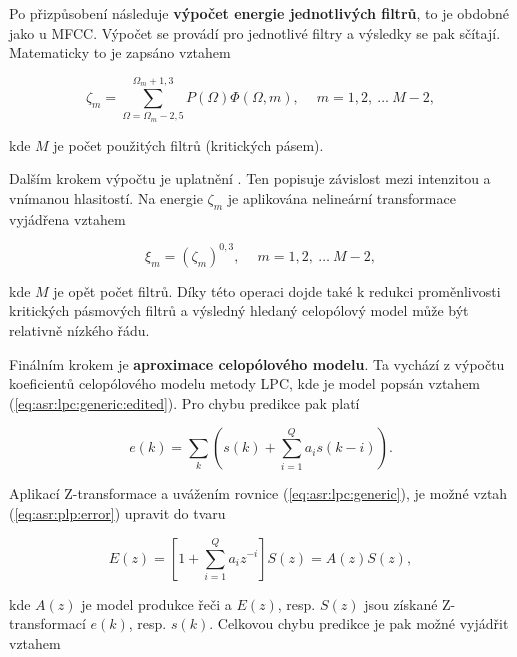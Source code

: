 Po přizpůsobení následuje \textbf{výpočet energie jednotlivých filtrů}, to je obdobné jako u MFCC. Výpočet se provádí pro jednotlivé filtry a výsledky se pak sčítají. Matematicky to je zapsáno vztahem

\begin{equation}
  \zeta_m = \sum_{\Omega = \Omega_m - 2,5}^{\Omega_m + 1,3} P\left(\Omega\right)\Phi\left(\Omega, m\right), \quad\ m=1, 2,\ \dots\ M - 2,
  \label{eq:asr:plp:energy}
\end{equation}

\noindent kde $M$ je počet použitých filtrů (kritických pásem).

Dalším krokem výpočtu je uplatnění \textbf{}. Ten popisuje závislost mezi intenzitou a vnímanou hlasitostí. Na energie $\zeta_m$ je aplikována nelineární transformace vyjádřena vztahem

\begin{equation}
  \xi_m = \left(\zeta_m\right)^{0,3}, \quad\ m = 1, 2,\ \dots\ M-2,
  \label{eq:asr:plp:energy:transform}
\end{equation}

\noindent kde $M$ je opět počet filtrů. Díky této operaci dojde také k redukci proměnlivosti  kritických pásmových filtrů a výsledný hledaný celopólový model může být relativně nízkého řádu.

Finálním krokem je \textbf{aproximace celopólového modelu}. Ta vychází z výpočtu koeficientů celopólového modelu metody LPC, kde je model popsán vztahem (\ref{eq:asr:lpc:generic:edited}). Pro chybu predikce pak platí

\begin{equation}
  e\left(k\right) = \sum_{k} \left(s\left(k\right) + \sum_{i=1}^{Q} a_i s\left(k - i\right)\right).
  \label{eq:asr:plp:error}
\end{equation}

\noindent Aplikací Z-transformace a uvážením rovnice (\ref{eq:asr:lpc:generic}), je možné vztah (\ref{eq:asr:plp:error}) upravit do tvaru

\begin{equation}
  E\left(z\right) = \left[1 + \sum_{i=1}^{Q} a_i z^{-i}\right] S\left(z\right) = A\left(z\right)S\left(z\right),
  \label{eq:asr:plp:error:transform}
\end{equation}

\noindent kde $A\left(z\right)$ je model produkce řeči a $E\left(z\right)$, resp. $S\left(z\right)$ jsou získané Z-transformací $e\left(k\right)$, resp. $s\left(k\right)$. Celkovou chybu predikce je pak možné vyjádřit vztahem

